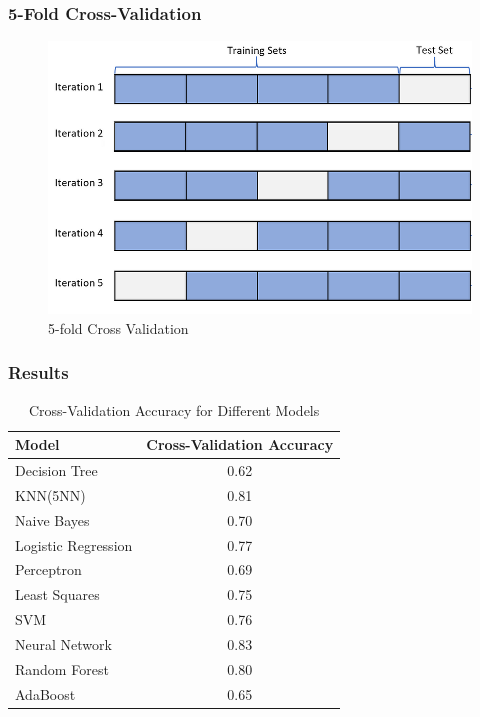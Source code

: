 \documentclass{beamer}
\begin{document}
\begin{frame}
\frametitle{5-Fold Cross-Validation}
\begin{figure}
    \centering
    \includegraphics[width=0.8\linewidth]{assets/cross-validation.png}
    \caption{5-fold Cross Validation}
    \label{fig:enter-label}
\end{figure}
\end{frame}

\begin{frame}
\frametitle{Results}

\begin{table}[ht]
\centering
\label{tab:cross_validation_accuracy}
\begin{adjustbox}{max width=\textwidth}
\begin{tabular}{@{}lc@{}}
\toprule
\textbf{Model} & \textbf{Cross-Validation Accuracy} \\ \midrule
Decision Tree      & 0.62 \\
KNN(5NN)           & 0.81 \\
Naive Bayes        & 0.70 \\
Logistic Regression & 0.77 \\
Perceptron         & 0.69 \\
Least Squares      & 0.75 \\
SVM                & 0.76 \\
Neural Network     & 0.83 \\
Random Forest      & 0.80 \\
AdaBoost           & 0.65 \\ \bottomrule
\end{tabular}
\end{adjustbox}
\caption{Cross-Validation Accuracy for Different Models}
\end{table}
\end{frame}
\end{document}

